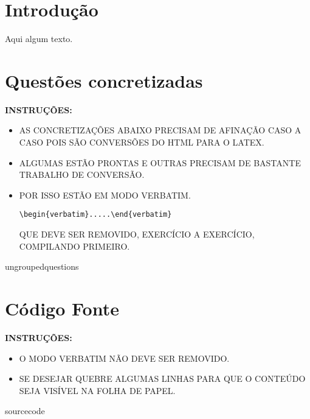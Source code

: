 \documentclass[a4paper]{book}
\begin{document}
\frontmatter

\tableofcontents


\mainmatter

\chapter{Introdução}

Aqui algum texto.

\chapter{Questões concretizadas}

\textbf{INSTRUÇÕES:}
\begin{itemize}
\item AS CONCRETIZAÇÕES ABAIXO PRECISAM DE AFINAÇÃO CASO A CASO POIS SÃO CONVERSÕES DO HTML PARA O LATEX. 
\item ALGUMAS ESTÃO PRONTAS E OUTRAS PRECISAM DE BASTANTE TRABALHO DE CONVERSÃO.
\item POR ISSO ESTÃO EM MODO VERBATIM. 
\begin{center}
\verb+\begin{verbatim}.....\end{verbatim}+
\end{center}
QUE DEVE SER REMOVIDO, EXERCÍCIO A EXERCÍCIO, COMPILANDO PRIMEIRO.
\end{itemize}




{{ungroupedquestions}}



\appendix

\chapter{Código Fonte}


\textbf{INSTRUÇÕES:}
\begin{itemize}
\item O MODO VERBATIM NÃO DEVE SER REMOVIDO.
\item SE DESEJAR QUEBRE ALGUMAS LINHAS PARA QUE O CONTEÚDO SEJA VISÍVEL NA FOLHA DE PAPEL.
\end{itemize}

{{sourcecode}}
\end{document}
